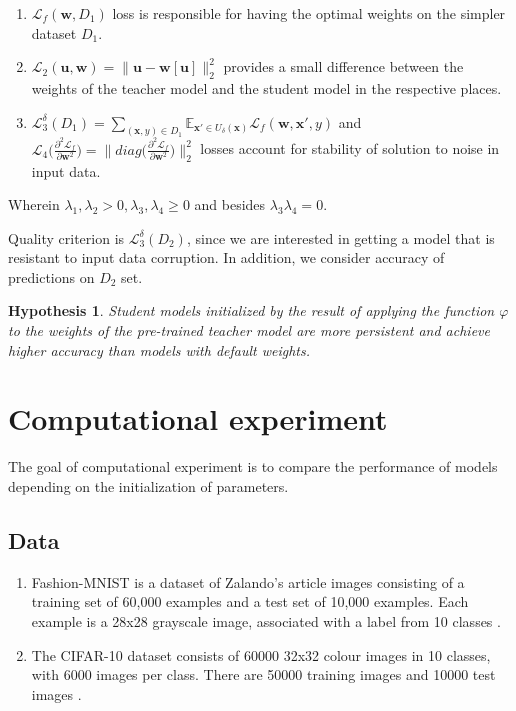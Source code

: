 \documentclass[80pt]{article}
\begin{document}
\begin{enumerate}
    \item $\mathcal{L}_f(\mathbf{w}, D_1)$ loss is responsible for having the optimal weights on the simpler dataset $D_1$.
    \item $\mathcal{L}_2 (\mathbf{u}, \mathbf{w}) = \|\textbf{u} - \textbf{w}[\textbf{u}]\|^2_2$ provides a small difference between the weights of the teacher model and the student model in the respective places.
    \item $\mathcal{L}_3^\delta (D_1) = \displaystyle \sum \limits_{(\textbf{x}, y) \in D_1} \displaystyle \mathbb{E}_{\textbf{x}' \in U_\delta(\textbf{x})} \mathcal{L}_f(\mathbf{w}, \textbf{x}', y)$  and  $\mathcal{L}_4 \bigl(\displaystyle \frac{\partial^2 \mathcal{L}_f}{\partial \mathbf{w}^2}\bigr) = \|diag{\bigl(\displaystyle \frac{\partial^2 \mathcal{L}_f}{\partial \mathbf{w}^2}\bigr)}\|^2_2$ losses account for stability of solution to noise in input data.
\end{enumerate}

Wherein $\lambda_1, \lambda_2 > 0, \lambda_3, \lambda_4 \ge 0$ and besides $\lambda_3 \lambda_4 = 0$.

Quality criterion is $\mathcal{L}_3^\delta (D_2)$, since we are interested in getting a model that is resistant to input data corruption. In addition, we consider accuracy of predictions on $D_2$ set.

\newtheorem{hypothesis}{Hypothesis}
\begin{hypothesis}
Student models initialized by the result of applying the function $\varphi$ to the weights of the pre-trained teacher model are more persistent and achieve higher accuracy than models with default weights.
\end{hypothesis}

\section{Computational experiment}

The goal of computational experiment is to compare the performance of models depending on the initialization of parameters. 

\subsection{Data}

\begin{enumerate}
    \item Fashion-MNIST is a dataset of Zalando's article images consisting of a training set of 60,000 examples and a test set of 10,000 examples. Each example is a 28x28 grayscale image, associated with a label from 10 classes  \citep{fashionmnist}.
    
    \item The CIFAR-10 dataset consists of 60000 32x32 colour images in 10 classes, with 6000 images per class. There are 50000 training images and 10000 test images \citep{cifar10}.
\end{enumerate}
\end{document}
